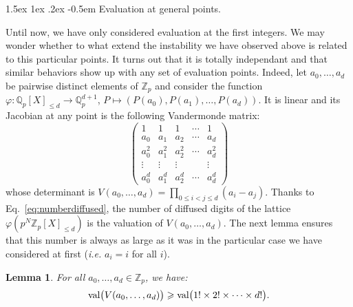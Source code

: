 \documentclass[11pt]{article}
\makeatletter
\numberwithin{equation}{section}
\numberwithin{figure}{section}
\renewcommand\subparagraph{\@startsection{subparagraph}{5}{\z@}%
                                       {1.5ex \@plus1ex \@minus .2ex}%
                                       {-0.5em}%
                                      {\normalfont\normalsize\it}}
\renewcommand{\leq}{\leqslant}
\renewcommand{\geq}{\geqslant}
\newtheorem{lem}[theo]{Lemma}
\theoremstyle{definition}
\newcommand{\Z}{\mathbb Z}
\newcommand{\Zp}{\Z_p}
\newcommand{\Q}{\mathbb Q}
\newcommand{\Qp}{\Q_p}
\newcommand{\val}{\text{\rm val}}
\makeatother
\begin{document}
\subparagraph{Evaluation at general points.}

Until now, we have only considered evaluation at the first integers. We 
may wonder whether to what extend the instability we have observed above 
is related to this particular points. 
It turns out that it is totally independant and that similar behaviors 
show up with any set of evaluation points. Indeed, let $a_0, \ldots, 
a_d$ be pairwise distinct elements of $\Zp$ and consider the function 
$\varphi : \Qp[X]_{\leq d} \to \Qp^{d+1}$, $P \mapsto (P(a_0), P(a_1), 
\ldots, P(a_d))$.
It is linear and its Jacobian at any point is the following Vandermonde 
matrix:
$$\left( \begin{matrix}
1 & 1 & 1 & \cdots & 1 \\
a_0 & a_1 & a_2 & \cdots & a_d \\
a_0^2 & a_1^2 & a_2^2 & \cdots & a_d^2 \\
\vdots & \vdots & \vdots & & \vdots \\
a_0^d & a_1^d & a_2^d & \cdots & a_d^d
\end{matrix} \right)$$
whose determinant is
$V(a_0, \ldots, a_d) = \prod_{0\leq i < j \leq d} (a_i - a_j)$.
Thanks to Eq.~\eqref{eq:numberdiffused}, the number of diffused digits 
of the lattice $\varphi(p^N \Zp[X]_{\leq d})$ is the valuation of 
$V(a_0, \ldots, a_d)$. The next lemma ensures that this number is always
as large as it was in the particular case we have considered at first
(\emph{i.e.} $a_i = i$ for all $i$).

\begin{lem}
For all $a_0, \ldots, a_d \in \Zp$, we have:
$$\val\big(V(a_0, \ldots, a_d)\big) \geq 
\val\big(1! \times 2! \times \cdots \times d!\big).$$
\end{lem}
\end{document}
